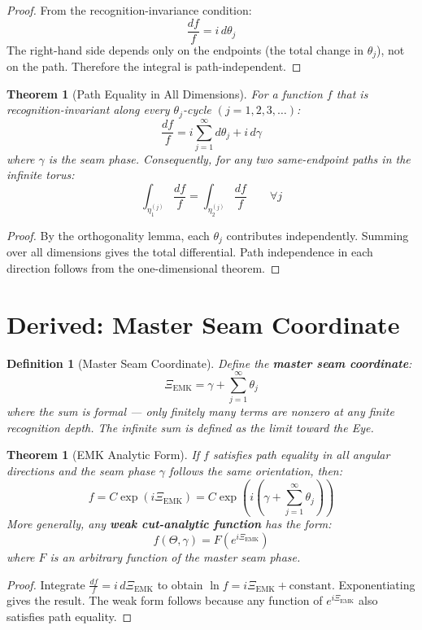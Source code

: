 \documentclass[12pt]{article}
\newtheorem{definition}[axiom]{Definition}
\newtheorem{theorem}[axiom]{Theorem}
\newcommand{\EMK}{\mathrm{EMK}}
\begin{document}
\begin{proof}
From the recognition-invariance condition:
\[
\frac{df}{f} = i\,d\theta_j
\]
The right-hand side depends only on the endpoints (the total change in \(\theta_j\)), not on the path.
Therefore the integral is path-independent.
\end{proof}

\begin{theorem}[Path Equality in All Dimensions]
For a function \(f\) that is recognition-invariant along every \(\theta_j\)-cycle \((j = 1, 2, 3, \ldots)\):
\[
\frac{df}{f} = i\sum_{j=1}^{\infty} d\theta_j + i\,d\gamma
\]
where \(\gamma\) is the seam phase. Consequently, for any two same-endpoint paths in the infinite torus:
\[
\int_{\eta_1^{(j)}} \frac{df}{f} = \int_{\eta_2^{(j)}} \frac{df}{f} \qquad \forall j
\]
\end{theorem}

\begin{proof}
By the orthogonality lemma, each \(\theta_j\) contributes independently.
Summing over all dimensions gives the total differential.
Path independence in each direction follows from the one-dimensional theorem.
\end{proof}

\section{Derived: Master Seam Coordinate}

\begin{definition}[Master Seam Coordinate]
Define the \textbf{master seam coordinate}:
\[
\Xi_{\mathrm{EMK}} = \gamma + \sum_{j=1}^{\infty} \theta_j
\]
where the sum is formal — only finitely many terms are nonzero at any finite recognition depth.
The infinite sum is defined as the limit toward the Eye.
\end{definition}

\begin{theorem}[EMK Analytic Form]
If \(f\) satisfies path equality in all angular directions and the seam phase \(\gamma\) follows the same orientation, then:
\[
f = C \exp\left(i \Xi_{\EMK}\right) = C \exp\left(i\left(\gamma + \sum_{j=1}^{\infty} \theta_j\right)\right)
\]
More generally, any \textbf{weak cut-analytic function} has the form:
\[
f(\Theta, \gamma) = F(e^{i\Xi_{\EMK}})
\]
where \(F\) is an arbitrary function of the master seam phase.
\end{theorem}

\begin{proof}
Integrate \(\frac{df}{f} = i\,d\Xi_{\EMK}\) to obtain \(\ln f = i\Xi_{\EMK} + \text{constant}\).
Exponentiating gives the result.
The weak form follows because any function of \(e^{i\Xi_{\EMK}}\) also satisfies path equality.
\end{proof}
\end{document}
